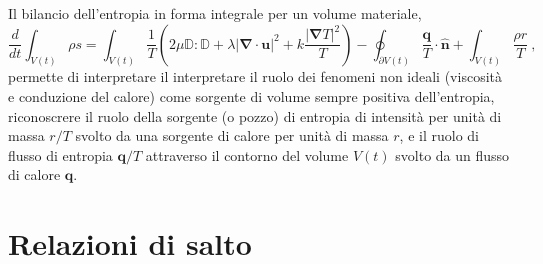 %
\newline \noindent
Il bilancio dell'entropia in forma integrale per un volume materiale,
\begin{equation}
 \dfrac{d}{dt}\int_{V(t)} \rho s = \int_{V(t)} \dfrac{1}{T} \left( 2 \mu \mathbb{D} : \mathbb{D} + \lambda |\bm{\nabla} \cdot \bm{u}|^2 + k \dfrac{|\bm{\nabla}T|^2}{T} \right)
 - \oint_{\partial V(t)} \dfrac{\bm{q}}{T} \cdot \bm{\hat{n}} + \int_{V(t)} \dfrac{\rho r}{T} \ ,
\end{equation}
permette di interpretare il interpretare il ruolo dei fenomeni non ideali (viscosità e conduzione del calore) come sorgente di volume sempre positiva dell'entropia, riconoscrere il ruolo della sorgente (o pozzo) di entropia di intensità per unità di massa $r/T$ svolto da una sorgente di calore per unità di massa $r$, e il ruolo di flusso di entropia $\bm{q}/T$ attraverso il contorno del volume $V(t)$ svolto da un flusso di calore $\bm{q}$.

\section{Relazioni di salto}


